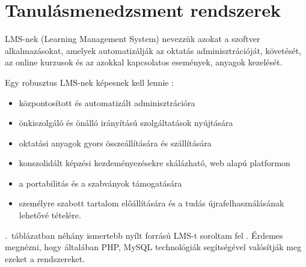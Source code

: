 \chapter{Tanulásmenedzsment rendszerek}
LMS-nek (Learning Management System) nevezzük azokat a szoftver alkalmazásokat, amelyek automatizálják az oktatás adminisztrációját, követését, az online kurzusok és az azokkal kapcsolatos események, anyagok kezelését.

Egy robusztus LMS-nek képesnek kell lennie \cite{link:ell}:
\begin{itemize}
\item központosított és automatizált adminisztrációra
\item önkiszolgáló és önálló irányítású szolgáltatások nyújtására
\item oktatási anyagok gyors összeállítására és szállítására
\item konszolidált képzési kezdeményezésekre skálázható, web alapú platformon
\item a portabilitás és a szabványok támogatására
\item személyre szabott tartalom előállítására és a tudás újrafelhasználásának lehetővé tételére.
\end{itemize}

.~táblázatban néhány ismertebb nyílt forrású LMS-t soroltam fel \cite{link:lms}. Érdemes megnézni, hogy általában PHP, MySQL technológiák segítségével valósítják meg ezeket a rendszereket.



